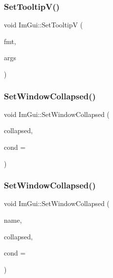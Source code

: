\hypertarget{namespace_im_gui_a3826acf68fc4a12bb66401575f51d6a2}{}\label{namespace_im_gui_a3826acf68fc4a12bb66401575f51d6a2} 
\subsubsection{\texorpdfstring{Set\+Tooltip\+V()}{SetTooltipV()}}
{\footnotesize\ttfamily void Im\+Gui\+::\+Set\+TooltipV (\begin{DoxyParamCaption}\item[{const char $\ast$}]{fmt,  }\item[{va\+\_\+list}]{args }\end{DoxyParamCaption})}

\hypertarget{namespace_im_gui_ab5445711a74e0e1a58d1e464cdda252f}{}\label{namespace_im_gui_ab5445711a74e0e1a58d1e464cdda252f} 
\subsubsection{\texorpdfstring{Set\+Window\+Collapsed()}{SetWindowCollapsed()}\hspace{0.1cm}{\footnotesize\ttfamily [1/2]}}
{\footnotesize\ttfamily void Im\+Gui\+::\+Set\+Window\+Collapsed (\begin{DoxyParamCaption}\item[{bool}]{collapsed,  }\item[{Im\+Gui\+Cond}]{cond = {} }\end{DoxyParamCaption})}

\hypertarget{namespace_im_gui_ac349187d6aae141cd3b4476e54bcc338}{}\label{namespace_im_gui_ac349187d6aae141cd3b4476e54bcc338} 
\subsubsection{\texorpdfstring{Set\+Window\+Collapsed()}{SetWindowCollapsed()}\hspace{0.1cm}{\footnotesize\ttfamily [2/2]}}
{\footnotesize\ttfamily void Im\+Gui\+::\+Set\+Window\+Collapsed (\begin{DoxyParamCaption}\item[{const char $\ast$}]{name,  }\item[{bool}]{collapsed,  }\item[{Im\+Gui\+Cond}]{cond = {} }\end{DoxyParamCaption})}

